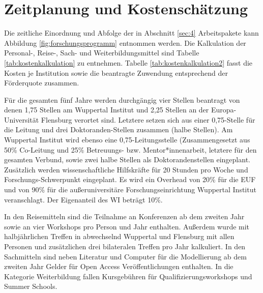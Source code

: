 \documentclass[a4paper,11pt,twoside]{scrartcl}
\begin{document}
\section{Zeitplanung und Kostenschätzung}


Die zeitliche Einordnung und Abfolge der in Abschnitt \ref{sec:4} Arbeitspakete kann Abbildung \ref{fig:forschungsprogramm} entnommen werden. Die Kalkulation der Personal-, Reise-, Sach- und Weiterbildungsmittel sind Tabelle \ref{tab:kostenkalkulation} zu entnehmen. Tabelle \ref{tab:kostenkalkulation2} fasst die Kosten je Institution sowie die beantragte Zuwendung entsprechend der Förderquote zusammen.

Für die gesamten fünf Jahre werden durchgängig vier Stellen beantragt von denen 1,75 Stellen am Wuppertal Institut und 2,25 Stellen an der Europa-Universität Flensburg verortet sind. Letztere setzen sich aus einer 0,75-Stelle für die Leitung und drei Doktoranden-Stellen zusammen (halbe Stellen). Am Wuppertal Institut wird ebenso eine 0,75-Leitungsstelle (Zusammengesetzt aus 50\% Co-Leitung und 25\% Betreuungs- bzw. Mentor*innenarbeit, letztere für den gesamten Verbund, sowie zwei halbe Stellen als Doktorandenstellen eingeplant. Zusätzlich werden wissenschaftliche Hilfskräfte für 20 Stunden pro Woche und Forschungs-Schwerpunkt eingeplant. Es wird ein Overhead von 20\% für die EUF und von 90\% für die außeruniversitäre Forschungseinrichtung Wuppertal Institut veranschlagt. Der Eigenanteil des WI beträgt 10\%.

In den Reisemitteln sind die Teilnahme an Konferenzen ab dem zweiten Jahr sowie an vier Workshops pro Person und Jahr enthalten. Außerdem wurde mit halbjährlichen Treffen in abwechselnd Wuppertal und Flensburg mit allen Personen und zusätzlichen drei bilateralen Treffen pro Jahr kalkuliert. In den Sachmitteln sind neben Literatur und Computer für die Modellierung ab dem zweiten Jahr Gelder für Open Access Veröffentlichungen enthalten. In die Kategorie Weiterbildung fallen Kursgebühren für Qualifizierungsworkshops und Summer Schools.
\end{document}
